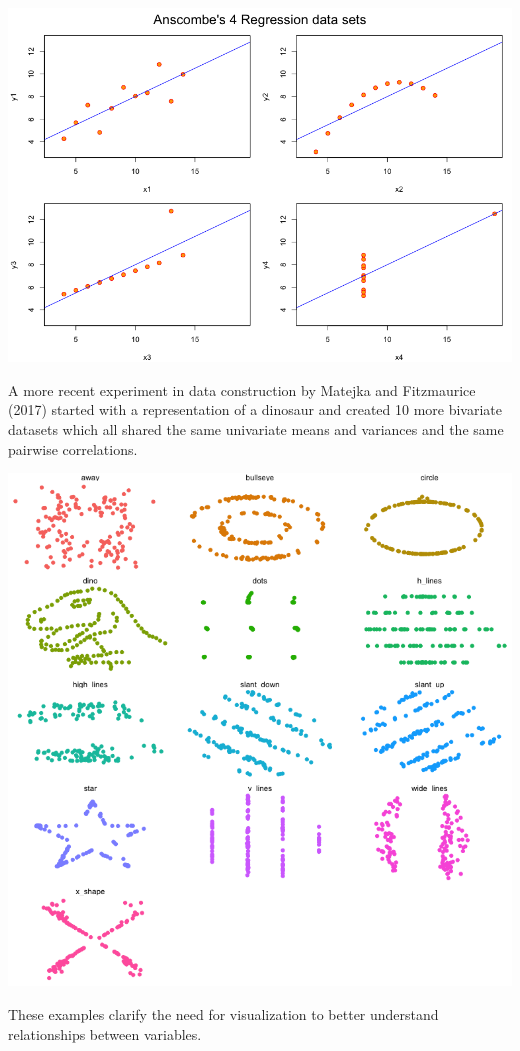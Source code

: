 \documentclass[
  letterpaper,
]{scrbook}
\begin{document}
\includegraphics{graphs/anscombe.png}

A more recent experiment in data construction by Matejka and Fitzmaurice (2017) started with a representation of a dinosaur and created 10 more bivariate datasets which all shared the same univariate means and variances and the same pairwise correlations.

\includegraphics{graphs/datasaurus.png}

These examples clarify the need for visualization to better understand relationships between variables.
\end{document}
